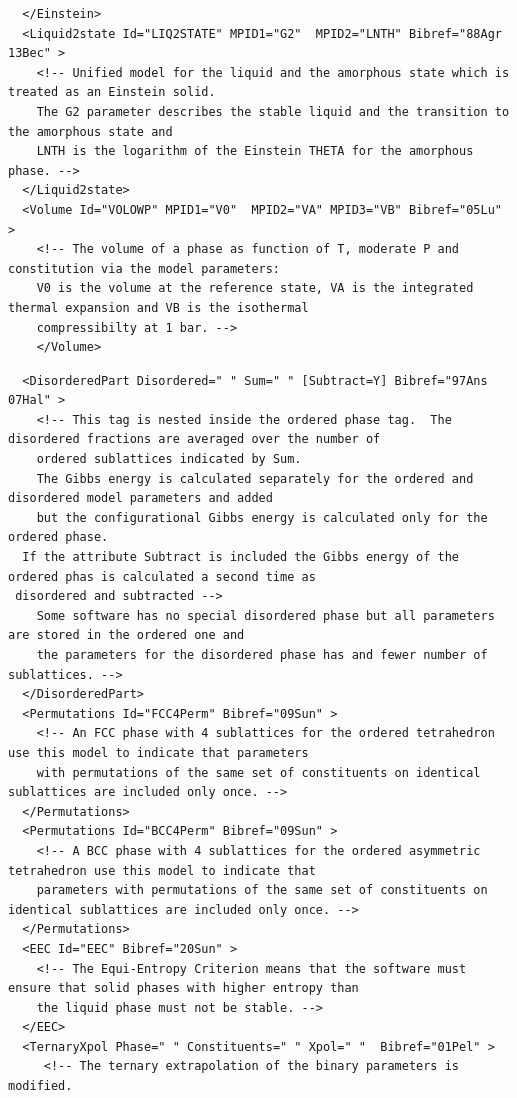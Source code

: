 \documentclass{article}
\begin{document}
\begin{appendices}
{\begin{verbatim}
  </Einstein>
  <Liquid2state Id="LIQ2STATE" MPID1="G2"  MPID2="LNTH" Bibref="88Agr 13Bec" > 
    <!-- Unified model for the liquid and the amorphous state which is treated as an Einstein solid.
    The G2 parameter describes the stable liquid and the transition to the amorphous state and
    LNTH is the logarithm of the Einstein THETA for the amorphous phase. -->
  </Liquid2state>
  <Volume Id="VOLOWP" MPID1="V0"  MPID2="VA" MPID3="VB" Bibref="05Lu" > 
    <!-- The volume of a phase as function of T, moderate P and constitution via the model parameters:
    V0 is the volume at the reference state, VA is the integrated thermal expansion and VB is the isothermal
    compressibilty at 1 bar. -->
    </Volume>
\end{verbatim}

\newpage

\begin{verbatim}
  <DisorderedPart Disordered=" " Sum=" " [Subtract=Y] Bibref="97Ans 07Hal" > 
    <!-- This tag is nested inside the ordered phase tag.  The disordered fractions are averaged over the number of
    ordered sublattices indicated by Sum.
    The Gibbs energy is calculated separately for the ordered and disordered model parameters and added 
    but the configurational Gibbs energy is calculated only for the ordered phase.
  If the attribute Subtract is included the Gibbs energy of the ordered phas is calculated a second time as
 disordered and subtracted -->
    Some software has no special disordered phase but all parameters are stored in the ordered one and
    the parameters for the disordered phase has and fewer number of sublattices. -->
  </DisorderedPart>
  <Permutations Id="FCC4Perm" Bibref="09Sun" > 
    <!-- An FCC phase with 4 sublattices for the ordered tetrahedron use this model to indicate that parameters 
    with permutations of the same set of constituents on identical sublattices are included only once. -->
  </Permutations>
  <Permutations Id="BCC4Perm" Bibref="09Sun" > 
    <!-- A BCC phase with 4 sublattices for the ordered asymmetric tetrahedron use this model to indicate that
    parameters with permutations of the same set of constituents on identical sublattices are included only once. -->
  </Permutations>
  <EEC Id="EEC" Bibref="20Sun" > 
    <!-- The Equi-Entropy Criterion means that the software must ensure that solid phases with higher entropy than
    the liquid phase must not be stable. -->
  </EEC>
  <TernaryXpol Phase=" " Constituents=" " Xpol=" "  Bibref="01Pel" > 
     <!-- The ternary extrapolation of the binary parameters is modified.

\end{verbatim}}
\end{appendices}
\end{document}
